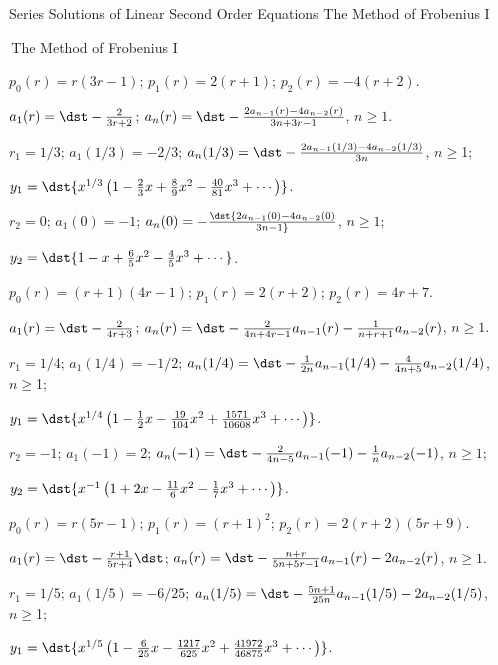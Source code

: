 \documentclass[dvips]{book}
\renewcommand{\exer}[1]{\par\medskip\;\noindent{\color{red}\bf #1.}}
\numberwithin{example}{section}
\numberwithin{equation}{section}
\numberwithin{theorem}{section}
\numberwithin{table}{section}
\numberwithin{figure}{section}
\begin{document}
 {Series Solutions of Linear Second Order Equations}
{The Method of Frobenius I}

\renewcommand{\thissection}{\sectiontitle
{\,The Method of Frobenius I }}
\thissection

\vspace*{-17.5pt}

\exer{7.5.2}
$p_0(r)=r(3r-1)$;
$p_1(r)=2(r+1)$;
$p_2(r)=-4(r+2)$.

$a_1(r)=\dst-{2\over3r+2}$;
$a_n(r)=\dst-{2a_{n-1}(r)-4a_{n-2}(r)\over3n+3r-1}$,
$n\ge1$.

$r_1=1/3$;
$a_1(1/3)=-2/3$;
$a_n(1/3)=\dst-{2a_{n-1}(1/3)-4a_{n-2}(1/3)\over3n}$,
$n\ge$1;

$y_1=\dst{x^{1/3}\left(1-{2\over3}x+{8\over9}x^2-
{40\over81}x^3+\cdots\right)}$.


$r_2=0$;
$a_1(0)=-1$;
$a_n(0)=-\dst{2a_{n-1}(0)-4a_{n-2}(0)\over3n-1}$,
$n\ge1$;

$y_2=\dst{1-x+{6\over5}x^2-{4\over5}x^3+\cdots}$.




\exer{7.5.4}
$p_0(r)=(r+1)(4r-1)$;
$p_1(r)=2(r+2)$;
$p_2(r)=4r+7$.

$a_1(r)=\dst-{2\over 4r+3}$;
$a_n(r)=\dst-{2\over 4n+4r-1}a_{n-1}(r)-{1\over n+r+1}a_{n-2}(r)$,
$n\ge1$.

$r_1=1/4$;
$a_1(1/4)=-1/2$;
$a_n(1/4)=\dst-{1\over 2n}a_{n-1}(1/4)-{4\over 4n+5}a_{n-2}(1/4)$,
$n\ge$1;


$y_1=\dst{x^{1/4}\left(1-{1\over2}x-{19\over104}x^2+
{1571\over10608}x^3+\cdots\right)}$.

$r_2=-1$;
$a_1(-1)=2$;
$a_n(-1)=\dst-{2\over 4n-5}a_{n-1}(-1)-{1\over n}a_{n-2}(-1)$,
$n\ge1$;

$y_2=\dst{x^{-1}\left(1+2x-{11\over6}x^2-{1\over7}x^3+\cdots\right)}$.


\exer{7.5.6}
$p_0(r)=r(5r-1)$;
$p_1(r)=(r+1)^2$;
$p_2(r)=2(r+2)(5r+9)$.


$a_1(r)=\dst-{r+1\over5r+4}\dst$;
$a_n(r)=\dst-{n+r\over5n+5r-1}a_{n-1}(r)-2a_{n-2}(r)$,
$n\ge1$.

$r_1=1/5$;
$a_1(1/5)=-6/25$;
$a_n(1/5)=\dst-{5n+1\over25n}a_{n-1}(1/5)-2a_{n-2}(1/5)$,
$n\ge$1;

$y_1=\dst{x^{1/5}\left(1-{6\over25}x-{1217\over625}x^2+
{41972\over46875}x^3
+\cdots\right)}$.
\end{document}

